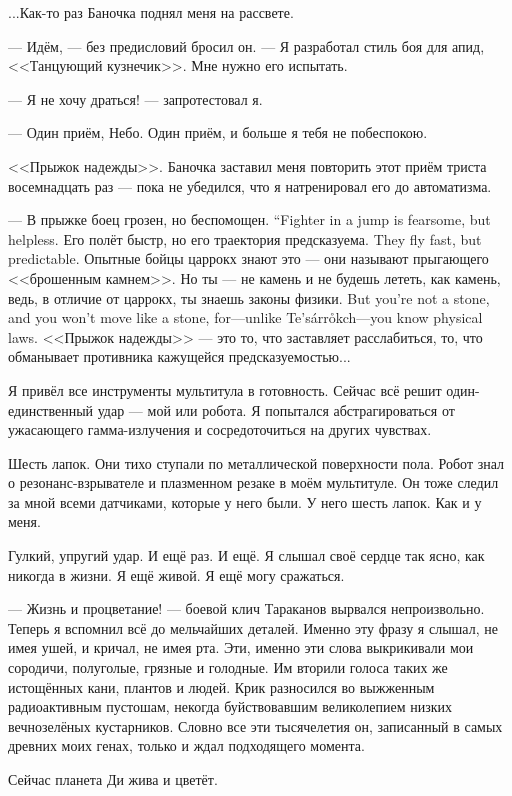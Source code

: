 ...Как-то раз Баночка поднял меня на рассвете.

--- Идём, --- без предисловий бросил он.
--- Я разработал стиль боя для апид, <<Танцующий кузнечик>>.
Мне нужно его испытать.

--- Я не хочу драться! --- запротестовал я.

--- Один приём, Небо.
Один приём, и больше я тебя не побеспокою.

<<Прыжок надежды>>.
Баночка заставил меня повторить этот приём триста восемнадцать раз --- пока не убедился, что я натренировал его до автоматизма.

{--- В прыжке боец грозен, но беспомощен.}
{``Fighter in a jump is fearsome, but helpless.}
{Его полёт быстр, но его траектория предсказуема.}
{They fly fast, but predictable.}
Опытные бойцы царрокх знают это --- они называют прыгающего <<брошенным камнем>>.
{Но ты --- не камень и не будешь лететь, как камень, ведь, в отличие от царрокх, ты знаешь законы физики.}
{But you're not a stone, and you won't move like a stone, for---unlike Te's\'{a}rr\r{o}kch---you know physical laws.}
<<Прыжок надежды>> --- это то, что заставляет расслабиться, то, что обманывает противника кажущейся предсказуемостью...

Я привёл все инструменты мультитула в готовность.
Сейчас всё решит один-единственный удар --- мой или робота.
Я попытался абстрагироваться от ужасающего гамма-излучения и сосредоточиться на других чувствах.

Шесть лапок.
Они тихо ступали по металлической поверхности пола.
Робот знал о резонанс-взрывателе и плазменном резаке в моём мультитуле.
Он тоже следил за мной всеми датчиками, которые у него были.
У него шесть лапок.
Как и у меня.

Гулкий, упругий удар.
И ещё раз.
И ещё.
Я слышал своё сердце так ясно, как никогда в жизни.
Я ещё живой.
Я ещё могу сражаться.

--- Жизнь и процветание! --- боевой клич Тараканов вырвался непроизвольно.
Теперь я вспомнил всё до мельчайших деталей.
Именно эту фразу я слышал, не имея ушей, и кричал, не имея рта.
Эти, именно эти слова выкрикивали мои сородичи, полуголые, грязные и голодные.
Им вторили голоса таких же истощённых кани, плантов и людей.
Крик разносился во выжженным радиоактивным пустошам, некогда буйствовавшим великолепием низких вечнозелёных кустарников.
Словно все эти тысячелетия он, записанный в самых древних моих генах, только и ждал подходящего момента.

Сейчас планета Ди жива и цветёт.

